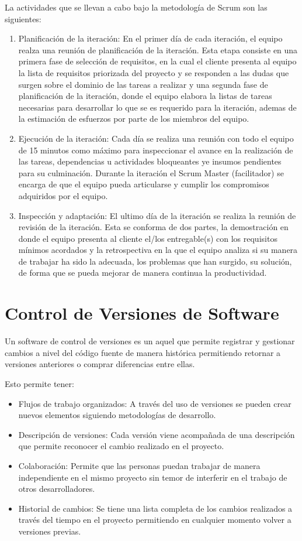 La actividades que se llevan a cabo bajo la metodología de Scrum son las siguientes:

\begin{enumerate}
\item Planificación de la iteración: En el primer día de cada iteración, el equipo realza una reunión de planificación de la iteración. Esta etapa consiste en una primera fase de selección de requisitos, en la cual el cliente presenta al equipo la lista de requisitos priorizada del proyecto y se responden a las dudas que surgen sobre el dominio de las tareas a realizar y una segunda fase de planificación de la iteración, donde el equipo elabora la listas de tareas necesarias para desarrollar lo que se es requerido para la iteración, ademas de la estimación de esfuerzos por parte de los miembros del equipo.
\item Ejecución de la iteración: Cada día se realiza una reunión con todo el equipo de 15 minutos como máximo para inspeccionar el avance en la realización de las tareas, dependencias u actividades bloqueantes ye insumos pendientes para su culminación. Durante la iteración el Scrum Master (facilitador) se encarga de que el equipo pueda articularse y cumplir los compromisos adquiridos por el equipo.
\item Inspección y adaptación: El ultimo día de la iteración se realiza la reunión de revisión de la iteración. Esta se conforma de dos partes, la demostración en donde el equipo presenta al cliente el/los entregable(s) con los requisitos mínimos acordados y la retrospectiva en la que el equipo analiza si su manera de trabajar ha sido la adecuada, los problemas que han surgido, su solución, de forma que se pueda mejorar de manera continua la productividad.
\end{enumerate}

\section{Control de Versiones de Software}
Un software de control de versiones es un aquel que permite registrar y gestionar cambios a nivel del código fuente de manera histórica permitiendo retornar a versiones anteriores o comprar diferencias entre ellas.

Esto permite tener:
\begin{itemize}
\item Flujos de trabajo organizados: A través del uso de versiones se pueden crear nuevos elementos siguiendo metodologías de desarrollo.
\item Descripción de versiones: Cada versión viene acompañada de una descripción que permite reconocer el cambio realizado en el proyecto.
\item Colaboración: Permite que las personas puedan trabajar de manera independiente en el mismo proyecto sin temor de interferir en el trabajo de otros desarrolladores.
\item Historial de cambios: Se tiene una lista completa de los cambios realizados a través del tiempo en el proyecto permitiendo en cualquier momento volver a versiones previas.
\end{itemize}

